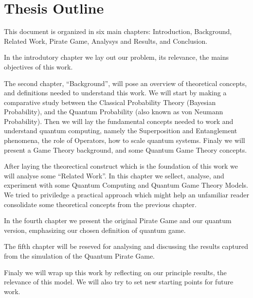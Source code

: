 \section{Thesis Outline}
\label{sec:int_outline}

This document is organized in six main chapters: Introduction, Background, Related Work, Pirate Game, Analysys and Results, and Conclusion. 

In the introdutory chapter we lay out our problem, its relevance, the mains objectives of this work.

The second chapter, ``Background'', will pose an overview of theoretical concepts, and definitions needed to understand this work. We will start by making a comparative study between the Classical Probability Theory (Bayesian Probability), and the Quantum Probability (also known as von Neumann Probability). Then we will lay the fundamental concepts needed to work and understand quantum computing, namely the Superposition and Entanglement phenomena, the role of Operators, how to scale quantum systems. Finaly we will present a Game Theory background, and some Quantum Game Theory concepts.

After laying the theorectical construct which is the foundation of this work we will analyse some ``Related Work''. In this chapter we sellect, analyse, and experiment with some Quantum Computing and Quantum Game Theory Models. We tried to priviledge a practical approach which might help an unfamiliar reader consolidate some theoretical concepts from the previous chapter. 

In the fourth chapter we present the original Pirate Game and our quantum version, emphasizing our chosen definition of quantum game. 

The fifth chapter will be reseved for analysing and discussing the results captured from the simulation of the Quantum Pirate Game.

Finaly we will wrap up this work by reflecting on our principle results, the relevance of this model. We will also try to set new starting points for future work. 
